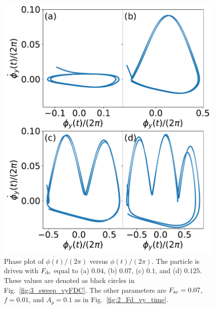 \documentclass[preprint,showpacs,preprintnumbers,amsmath,amssymb,aps,prb]{revtex4-1}
\theoremstyle{remark}
\begin{document}
    \begin{figure}[h!]
      \centering
      \includegraphics[width=\columnwidth]{fig4_phase.pdf}
      \caption{
        Phase plot of $\dot{\phi(t)}/(2\pi)$ versus $\phi(t)/(2\pi)$.
        The particle is driven with $F_{\rm dc}$ equal to  (a) $0.04$, (b) $0.07$, (c) $0.1$, and (d) $0.125$.  These values are denoted as black circles
        in Fig.~\ref{fig:3_sweep_vyFDC}. 
      The other parameters
      are $F_{\rm ac} = 0.07$, $f=0.01$, and $A_p = 0.1$
      as in Fig.~\ref{fig:2_Fd_vy_time}.}
      \label{fig:4_phase}
    \end{figure}
\end{document}
